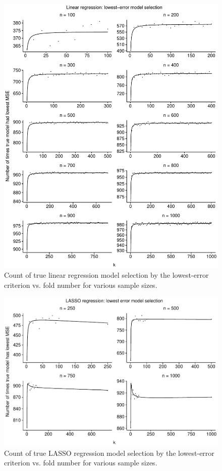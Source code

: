\documentclass[
  12pt,
]{article}
\begin{document}
\begin{figure}[H]

{\centering \includegraphics{manuscript_files/figure-latex/unnamed-chunk-7-1} 

}

\caption{Count of true linear regression model selection by the lowest-error criterion vs. fold number for various sample sizes.}\label{fig:unnamed-chunk-7}
\end{figure}

\begin{figure}[H]

{\centering \includegraphics{manuscript_files/figure-latex/unnamed-chunk-8-1} 

}

\caption{Count of true LASSO regression model selection by the lowest-error criterion vs. fold number for various sample sizes.}\label{fig:unnamed-chunk-8}
\end{figure}
\end{document}
